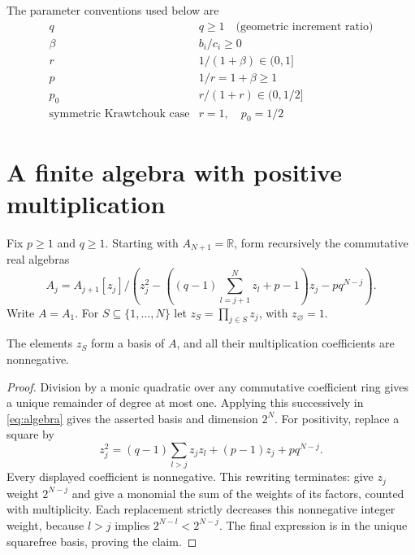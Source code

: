 The parameter conventions used below are
\[
\begin{array}{c|l}
q & q\geq1\quad\text{(geometric increment ratio)}\\
\beta & b_i/c_i\geq0\\
r & 1/(1+\beta)\in(0,1]\\
p & 1/r=1+\beta\geq1\\
p_0 & r/(1+r)\in(0,1/2]\\
\text{symmetric Krawtchouk case} & r=1,\quad p_0=1/2
\end{array}
\]

\section{A finite algebra with positive multiplication}\label{sec:algebra}
Fix $p\geq1$ and $q\geq1$. Starting with $A_{N+1}=\mathbb R$, form recursively the commutative real algebras
\begin{equation}\label{eq:algebra}
A_j=A_{j+1}[z_j]\big/
\left(z_j^2-\left((q-1)\sum_{l=j+1}^N z_l+p-1\right)z_j-pq^{N-j}\right).
\end{equation}
Write $A=A_1$. For $S\subseteq\{1,\ldots,N\}$ let $z_S=\prod_{j\in S}z_j$, with $z_\varnothing=1$.

\begin{lemma}\label{lem:basis}
The elements $z_S$ form a basis of $A$, and all their multiplication coefficients are nonnegative.
\end{lemma}
\begin{proof}
Division by a monic quadratic over any commutative coefficient ring gives a unique remainder of degree at most one. Applying this successively in \eqref{eq:algebra} gives the asserted basis and dimension $2^N$.
For positivity, replace a square by
\[
z_j^2=(q-1)\sum_{l>j}z_jz_l+(p-1)z_j+pq^{N-j}.
\]
Every displayed coefficient is nonnegative. This rewriting terminates: give $z_j$ weight $2^{N-j}$ and give a monomial the sum of the weights of its factors, counted with multiplicity. Each replacement strictly decreases this nonnegative integer weight, because $l>j$ implies $2^{N-l}<2^{N-j}$. The final expression is in the unique squarefree basis, proving the claim.
\end{proof}

